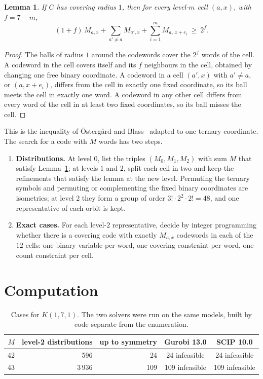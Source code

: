 \documentclass[11pt]{article}
\newtheorem{lemma}[theorem]{Lemma}
\theoremstyle{remark}
\begin{document}
\begin{lemma}\label{lem:count}
If $C$ has covering radius $1$, then for every level-$m$ cell $(a,x)$, with $f=7-m$,
\[
(1+f)\,M_{a,x}+\sum_{a'\neq a}M_{a',x}+\sum_{i=1}^{m}M_{a,\,x+e_i}\ \ge\ 2^{f}.
\]
\end{lemma}

\begin{proof}
The balls of radius $1$ around the codewords cover the $2^f$ words of the cell. A codeword in the
cell covers itself and its $f$ neighbours in the cell, obtained by changing one free binary
coordinate. A codeword in a cell $(a',x)$ with $a'\neq a$, or $(a,x+e_i)$, differs from the cell
in exactly one fixed coordinate, so its ball meets the cell in exactly one word. A codeword in
any other cell differs from every word of the cell in at least two fixed coordinates, so its ball
misses the cell.
\end{proof}

This is the inequality of Östergård and Blass~\cite{ob} adapted to one ternary coordinate. The
search for a code with $M$ words has two steps.
\begin{enumerate}
\item \textbf{Distributions.} At level $0$, list the triples $(M_0,M_1,M_2)$ with sum $M$ that
  satisfy Lemma~\ref{lem:count}; at levels $1$ and $2$, split each cell in two and keep the
  refinements that satisfy the lemma at the new level. Permuting the ternary symbols and
  permuting or complementing the fixed binary coordinates are isometries; at level $2$ they form a
  group of order $3!\cdot 2^2\cdot 2!=48$, and one representative of each orbit is kept.
\item \textbf{Exact cases.} For each level-$2$ representative, decide by integer programming
  whether there is a covering code with exactly $M_{a,x}$ codewords in each of the $12$ cells:
  one binary variable per word, one covering constraint per word, one count constraint per cell.
\end{enumerate}

\section{Computation}

\begin{table}[h]
\centering
\begin{tabular}{rrrcc}
\toprule
$M$ & level-2 distributions & up to symmetry & Gurobi 13.0 & SCIP 10.0 \\
\midrule
42 & 596    & 24  & 24 infeasible  & 24 infeasible \\
43 & 3\,936 & 109 & 109 infeasible & 109 infeasible \\
\bottomrule
\end{tabular}
\caption{Cases for $K(1,7,1)$. The two solvers were run on the same models, built by code separate
from the enumeration.}\label{tab:cases}
\end{table}
\end{document}
